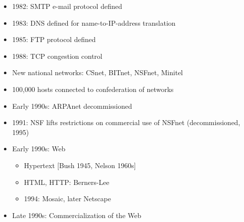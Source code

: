 \begin{itemize}
\begin{itemize}
      \item 1982: SMTP e-mail protocol defined

      \item 1983: DNS defined for name-to-IP-address translation

      \item 1985: FTP protocol defined

      \item 1988: TCP congestion control

      \item New national networks: CSnet, BITnet, NSFnet, Minitel

      \item 100,000 hosts connected to confederation of networks

      \item Early 1990s: ARPAnet decommissioned

      \item 1991: NSF lifts restrictions on commercial use of NSFnet (decommissioned, 1995)

      \item Early 1990s: Web

        \begin{itemize}

          \item Hypertext [Bush 1945, Nelson 1960s]

          \item HTML, HTTP: Berners-Lee

          \item 1994: Mosaic, later Netscape

        \end{itemize}

      \item Late 1990s: Commercialization of the Web

    \end{itemize}

\end{itemize}



